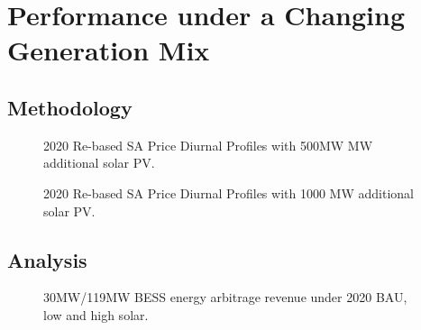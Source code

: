 \chapter{ Performance under a Changing Generation Mix}
\section{ Methodology }
\begin{figure}[H]
    \centering
    \caption{2020 Re-based SA Price Diurnal Profiles with 500MW MW additional solar PV.}
    \label{fig:bess_w_low_solar}
\end{figure}
\begin{figure}[H]
    \centering
    \caption{2020 Re-based SA Price Diurnal Profiles with 1000 MW additional solar PV.}
    \label{fig:bess_w_high_solar}
\end{figure}
\section{ Analysis }
\begin{figure}[H]
    \centering
    \caption{30MW/119MW BESS energy arbitrage revenue under 2020 BAU, low and high solar.}
    \label{fig:bess_w_solar}
\end{figure}
